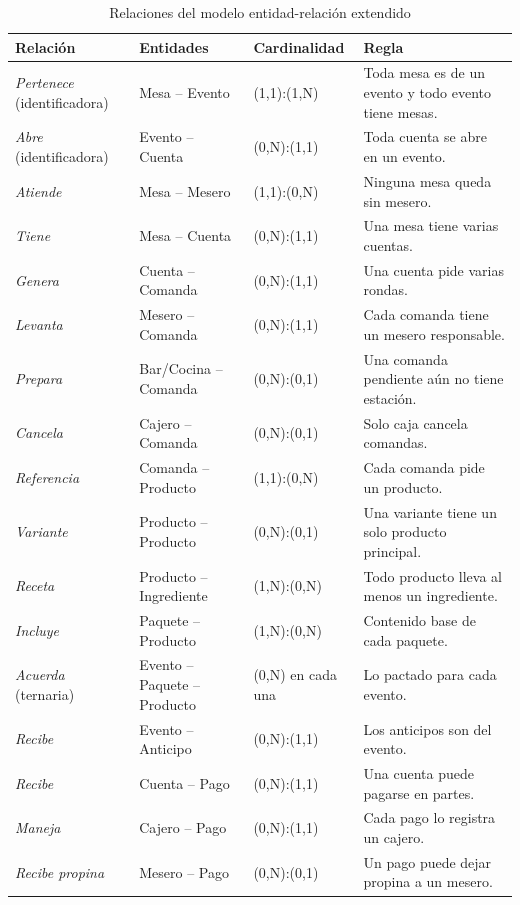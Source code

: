 \begin{table}[H]
    \centering
    \footnotesize
    \begin{tabularx}{\textwidth}
        {
            >{\RaggedRight\arraybackslash}p{3.2cm}
            >{\RaggedRight\arraybackslash}p{4.6cm}
            >{\RaggedRight\arraybackslash}p{2.4cm}
            >{\RaggedRight\arraybackslash}X
        }
        \toprule
        \textbf{Relación} & \textbf{Entidades} & \textbf{Cardinalidad} & \textbf{Regla} \\
        \midrule
        \textit{Pertenece} (identificadora) & Mesa -- Evento & (1,1):(1,N) & Toda mesa es de un evento y todo evento tiene mesas. \\
        \textit{Abre} (identificadora) & Evento -- Cuenta & (0,N):(1,1) & Toda cuenta se abre en un evento. \\
        \textit{Atiende} & Mesa -- Mesero & (1,1):(0,N) & Ninguna mesa queda sin mesero. \\
        \textit{Tiene} & Mesa -- Cuenta & (0,N):(1,1) & Una mesa tiene varias cuentas. \\
        \textit{Genera} & Cuenta -- Comanda & (0,N):(1,1) & Una cuenta pide varias rondas. \\
        \textit{Levanta} & Mesero -- Comanda & (0,N):(1,1) & Cada comanda tiene un mesero responsable. \\
        \textit{Prepara} & Bar/Cocina -- Comanda & (0,N):(0,1) & Una comanda pendiente aún no tiene estación. \\
        \textit{Cancela} & Cajero -- Comanda & (0,N):(0,1) & Solo caja cancela comandas. \\
        \textit{Referencia} & Comanda -- Producto & (1,1):(0,N) & Cada comanda pide un producto. \\
        \textit{Variante} & Producto -- Producto & (0,N):(0,1) & Una variante tiene un solo producto principal. \\
        \textit{Receta} & Producto -- Ingrediente & (1,N):(0,N) & Todo producto lleva al menos un ingrediente. \\
        \textit{Incluye} & Paquete -- Producto & (1,N):(0,N) & Contenido base de cada paquete. \\
        \textit{Acuerda} (ternaria) & Evento -- Paquete -- Producto & (0,N) en cada una & Lo pactado para cada evento. \\
        \textit{Recibe} & Evento -- Anticipo & (0,N):(1,1) & Los anticipos son del evento. \\
        \textit{Recibe} & Cuenta -- Pago & (0,N):(1,1) & Una cuenta puede pagarse en partes. \\
        \textit{Maneja} & Cajero -- Pago & (0,N):(1,1) & Cada pago lo registra un cajero. \\
        \textit{Recibe propina} & Mesero -- Pago & (0,N):(0,1) & Un pago puede dejar propina a un mesero. \\
        \bottomrule
    \end{tabularx}
    \captionsetup{labelfont=bf, textfont=it, labelsep=newline, justification=raggedright, singlelinecheck=false}
    \caption{Relaciones del modelo entidad-relación extendido}
    \label{tab:relaciones}
\end{table}

